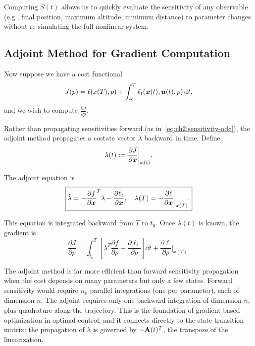 Computing $S(t)$ allows us to quickly evaluate the sensitivity of any observable (e.g., final position,
maximum altitude, minimum distance) to parameter changes without re-simulating the full nonlinear system.

\subsection{Adjoint Method for Gradient Computation}

Now suppose we have a cost functional
\begin{equation}
J(p) = \ell(x(T), p) + \int_{t_0}^{T}\ell_t(\bm{x}(t),\bm{u}(t),p)\,\mathrm{d} t,
\label{eq:ch2:cost}
\end{equation}
and we wish to compute $\frac{\partial J}{\partial p}$.

Rather than propagating sensitivities forward (as in~\eqref{eq:ch2:sensitivity-ode}), the adjoint method
propagates a costate vector $\lambda$ backward in time. Define
\begin{equation}
\lambda(t) := \frac{\partial J}{\partial \bm{x}}\bigg|_{\bm{x}(t)}.
\label{eq:ch2:costate}
\end{equation}

The adjoint equation is
\begin{equation}
\boxed{
\dot\lambda = -\frac{\partial f}{\partial \bm{x}}^T\lambda - \frac{\partial \ell_t}{\partial \bm{x}},
\quad \lambda(T) = -\frac{\partial \ell}{\partial \bm{x}}\bigg|_{x(T)}.
}
\label{eq:ch2:adjoint}
\end{equation}

This equation is integrated backward from $T$ to $t_0$. Once $\lambda(t)$ is known, the gradient is
\begin{equation}
\frac{\partial J}{\partial p} = \int_{t_0}^{T}\left[\lambda^T\frac{\partial f}{\partial p} + \frac{\partial \ell_t}{\partial p}\right]\dd t
+ \frac{\partial \ell}{\partial p}\bigg|_{x(T)}.
\label{eq:ch2:grad-adjoint}
\end{equation}

\begin{designbox}
The adjoint method is far more efficient than forward sensitivity propagation when the cost depends on
many parameters but only a few states. Forward sensitivity would require $n_p$ parallel integrations
(one per parameter), each of dimension $n$. The adjoint requires only one backward integration of dimension $n$,
plus quadrature along the trajectory. This is the foundation of gradient-based optimization in optimal control,
and it connects directly to the state transition matrix: the propagation of $\lambda$ is governed by
$-\mathbf{A}(t)^T$, the transpose of the linearization.
\end{designbox}

